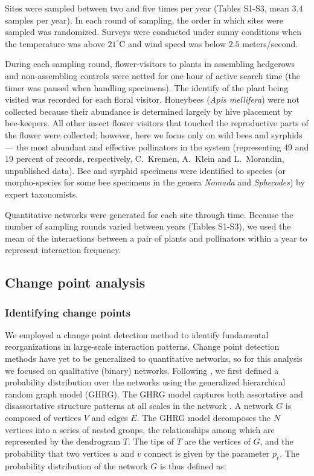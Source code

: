 \documentclass[12pt]{article}
\begin{document}
Sites were sampled between two and five times per year (Tables S1-S3,
mean $3.4$ samples per year). In each round of sampling, the order in
which sites were sampled was randomized. Surveys were conducted under
sunny conditions when the temperature was above $21^{\circ}\mathrm{C}$
and wind speed was below $2.5$ meters/second.

During each sampling round, flower-visitors to plants in assembling
hedgerows and non-assembling controls were netted for one hour of
active search time (the timer was paused when handling specimens). The
identify of the plant being visited was recorded for each floral
visitor. Honeybees (\textit{Apis mellifera}) were not collected
because their abundance is determined largely by hive placement by
bee-keepers. All other insect flower visitors that touched the
reproductive parts of the flower were collected; however, here we
focus only on wild bees and syrphids --- the most abundant and
effective pollinators in the system (representing 49 and 19 percent of
records, respectively, C.~Kremen, A.~Klein and L.~Morandin,
unpublished data). Bee and syrphid specimens were identified to
species (or morpho-species for some bee specimens in the genera
\textit{Nomada} and \textit{Sphecodes}) by expert taxonomists.

Quantitative networks were generated for each site through
time. Because the number of sampling rounds varied between years
(Tables S1-S3), we used the mean of the interactions between a pair of
plants and pollinators within a year to represent interaction
frequency.

\subsection*{Change point analysis}
\subsubsection*{Identifying change points}
We employed a change point detection method \citep{peel2014detecting}
to identify fundamental reorganizations in large-scale interaction
patterns. Change point detection methods have yet to be generalized to
quantitative networks, so for this analysis we focused on qualitative
(binary) networks. Following \cite{peel2014detecting}, we first
defined a probability distribution over the networks using the
generalized hierarchical random graph model (GHRG). The GHRG model
captures both assortative and disassortative structure patterns at all
scales in the network \citep{peel2014detecting}. A network $G$ is
composed of vertices $V$ and edges $E$. The GHRG model decomposes the
$N$ vertices into a series of nested groups, the relationships among
which are represented by the dendrogram $T$. The tips of $T$ are the
vertices of $G$, and the probability that two vertices $u$ and $v$
connect is given by the parameter $p_r$. The probability distribution
of the network $G$ is thus defined as:
\end{document}
